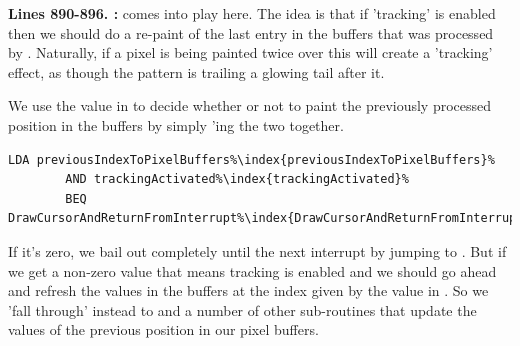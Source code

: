 \textbf{Lines 890-896. :} 
 comes into play here. The idea is that if 'tracking'
is enabled then we should do a re-paint of the last entry in the buffers that was
processed by . Naturally, if a pixel is being painted twice
over this will create a 'tracking' effect, as though the pattern is trailing a 
glowing tail after it.

We use the value in  to decide whether or not to paint
the previously processed position in the buffers by simply 'ing the
two together.

\begin{lstlisting}[escapechar=\%]
        LDA previousIndexToPixelBuffers%\index{previousIndexToPixelBuffers}%
        AND trackingActivated%\index{trackingActivated}%
        BEQ DrawCursorAndReturnFromInterrupt%\index{DrawCursorAndReturnFromInterrupt}%
\end{lstlisting}

If it's zero, we bail out
completely until the next interrupt by jumping to .
But if we get a non-zero value that means tracking is enabled and 
we should go ahead and refresh the values in the buffers at the index given
by the value in . So we 'fall through' instead to
 and a number of other sub-routines that update the
values of the previous position in our pixel buffers.

